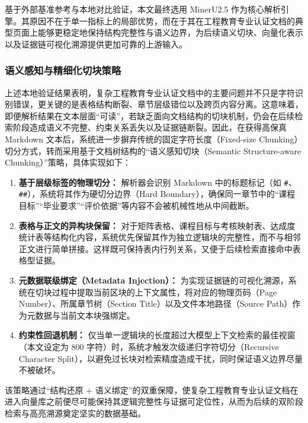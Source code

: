 \documentclass[UTF8,a4paper,zihao=-4]{ctexart}
\begin{document}
基于外部基准参考与本地对比验证，本文最终选用 MinerU2.5 作为核心解析引擎。其原因不在于单一指标上的局部优势，而在于其在工程教育专业认证文档的典型页面上能够更稳定地保持结构完整性与语义边界，为后续语义切块、向量化表示以及证据链可视化溯源提供更加可靠的上游输入。

\subsubsection{语义感知与精细化切块策略}

上述本地验证结果表明，复杂工程教育专业认证文档中的主要问题并不只是字符识别错误，更关键的是表格结构断裂、章节层级错位以及跨页内容分离。这意味着，即便解析结果在文本层面“可读”，若缺乏面向文档结构的切块机制，仍会在后续检索阶段造成语义不完整、约束关系丢失以及证据链断裂。因此，在获得高保真 Markdown 文本后，系统进一步摒弃传统的固定字符长度（Fixed-size Chunking）切分方式，转而采用基于文档树结构的“语义感知切块（Semantic Structure-aware Chunking）”策略，具体实现如下：

\begin{enumerate}
  \item \textbf{基于层级标签的物理切分：}  
  解析器会识别 Markdown 中的标题标记（如 \texttt{\#}、\texttt{\#\#}），系统将其作为硬切分边界（Hard Boundary），确保同一章节中的“课程目标”“毕业要求”“评价依据”等内容不会被机械性地从中间截断。

  \item \textbf{表格与正文的异构块保留：}  
  对于矩阵表格、课程目标与考核映射表、达成度统计表等结构化内容，系统优先保留其作为独立逻辑块的完整性，而不与相邻正文进行简单拼接。这样既可保持表内行列关系，又便于后续检索直接命中表格型证据。

  \item \textbf{元数据联级绑定（Metadata Injection）：}  
  为实现证据链的可视化溯源，系统在切块过程中提取当前区块的上下文属性，将对应的物理页码（Page Number）、所属章节树（Section Title）以及文件本地路径（Source Path）作为元数据与当前文本块强绑定。

  \item \textbf{约束性回退机制：}  
  仅当单一逻辑块的长度超过大模型上下文检索的最佳视窗（本文设定为 800 字符）时，系统才触发次级递归字符切分（Recursive Character Split），以避免过长块对检索精度造成干扰，同时保证语义边界尽量不被破坏。
\end{enumerate}

该策略通过“结构还原 + 语义绑定”的双重保障，使复杂工程教育专业认证文档在进入向量库之前便尽可能保持其逻辑完整性与证据可定位性，从而为后续的双阶段检索与高亮溯源奠定坚实的数据基础。
\end{document}
